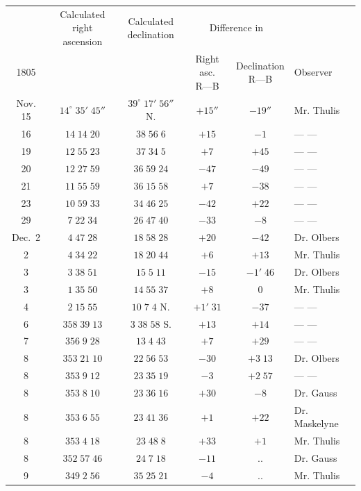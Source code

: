 \begin{center}\begingroup
\fontsize{9}{11}\selectfont
\setlength{\tabcolsep}{2pt}\renewcommand{\arraystretch}{1.12}
\begin{tabular}{c|cc|cc|l}
& \shortstack{Calculated right\\ascension} & \shortstack{Calculated\\declination} & \multicolumn{2}{c|}{Difference in} & \\
1805 & & & \shortstack{Right asc.\\R---B} & \shortstack{Declination\\R---B} & Observer \\
\hline
Nov. 15 & $14^\circ\;35'\;45''$ & $39^\circ\;17'\;56''$ N. & $+15''$ & $-19''$ & Mr. Thulis \\
16 & $14\;14\;20$ & $38\;56\;6$ & $+15$ & $-1$ & --- --- \\
19 & $12\;55\;23$ & $37\;34\;5$ & $+7$ & $+45$ & --- --- \\
20 & $12\;27\;59$ & $36\;59\;24$ & $-47$ & $-49$ & --- --- \\
21 & $11\;55\;59$ & $36\;15\;58$ & $+7$ & $-38$ & --- --- \\
23 & $10\;59\;33$ & $34\;46\;25$ & $-42$ & $+22$ & --- --- \\
29 & $7\;22\;34$ & $26\;47\;40$ & $-33$ & $-8$ & --- --- \\
Dec.\ 2 & $4\;47\;28$ & $18\;58\;28$ & $+20$ & $-42$ & Dr. Olbers \\
2 & $4\;34\;22$ & $18\;20\;44$ & $+6$ & $+13$ & Mr. Thulis \\
3 & $3\;38\;51$ & $15\;5\;11$ & $-15$ & $-1'\;46$ & Dr. Olbers \\
3 & $1\;35\;50$ & $14\;55\;37$ & $+8$ & $0$ & Mr. Thulis \\
4 & $2\;15\;55$ & $10\;7\;4$ N. & $+1'\;31$ & $-37$ & --- --- \\
6 & $358\;39\;13$ & $3\;38\;58$ S. & $+13$ & $+14$ & --- --- \\
7 & $356\;9\;28$ & $13\;4\;43$ & $+7$ & $+29$ & --- --- \\
8 & $353\;21\;10$ & $22\;56\;53$ & $-30$ & $+3\;13$ & Dr. Olbers \\
8 & $353\;9\;12$ & $23\;35\;19$ & $-3$ & $+2\;57$ & --- --- \\
8 & $353\;8\;10$ & $23\;36\;16$ & $+30$ & $-8$ & Dr. Gauss \\
8 & $353\;6\;55$ & $23\;41\;36$ & $+1$ & $+22$ & Dr. Maskelyne \\
8 & $353\;4\;18$ & $23\;48\;8$ & $+33$ & $+1$ & Mr. Thulis \\
8 & $352\;57\;46$ & $24\;7\;18$ & $-11$ & .\quad . & Dr. Gauss \\
9 & $349\;2\;56$ & $35\;25\;21$ & $-4$ & .\quad . & Mr. Thulis \\
\end{tabular}\endgroup\end{center}
